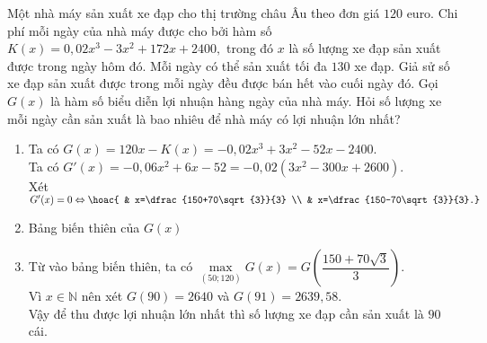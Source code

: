 \begin{ex}
	Một nhà máy sản xuất xe đạp cho thị trường châu Âu theo đơn giá $120$ euro. Chi phí mỗi ngày của nhà máy được cho bởi hàm số
	$K(x)=0{,}02x^3-3x^2+172x+2400,$
	trong đó $x$ là số lượng xe đạp sản xuất được trong ngày hôm đó. Mỗi ngày có thể sản xuất tối đa $130$ xe đạp. Giả sử số xe đạp sản xuất được trong mỗi ngày đều được bán hết vào cuối ngày đó. Gọi $G(x)$ là hàm số biểu diễn lợi nhuận hàng ngày của nhà máy. Hỏi số lượng xe mỗi ngày cần sản xuất là bao nhiêu để nhà máy có lợi nhuận lớn nhất? \\
	\loigiai
	{
		\begin{enumerate}[$\bullet$]
			\item
			Ta có $G(x)=120x-K(x)=-0{,}02x^3+3x^2-52x-2400$. \\
			Ta có $G'(x)=-0{,}06x^2+6x-52=-0{,}02\left(3x^2-300x+2600\right)$. \\
			Xét $G'(x)=0 \Leftrightarrow \hoac{ & x=\dfrac{150+70\sqrt{3}}{3} \\ & x=\dfrac{150-70\sqrt{3}}{3}.}$ \\
			\item Bảng biến thiên của $G(x)$
			\begin{center}
			\end{center}
			\item Từ vào bảng biến thiên, ta có $\max\limits_{(50;120)} G(x)=G\left(\dfrac{150+70\sqrt{3}}{3}\right)$. \\
			Vì $x\in\mathbb{N}$ nên xét $G(90)=2640$ và $G(91)=2639{,}58$. \\
			Vậy để thu được lợi nhuận lớn nhất thì số lượng xe đạp cần sản xuất là $90$ cái.
		\end{enumerate}
	}
\end{ex}


